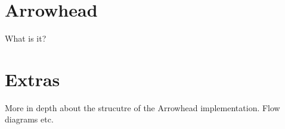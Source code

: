 \section*{Arrowhead}
What is it?
\section*{Extras}
More in depth about the strucutre of the Arrowhead implementation. Flow diagrams etc. 
